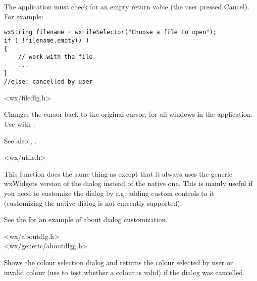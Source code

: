 The application must check for an empty return value (the user pressed
Cancel). For example:

\begin{verbatim}
wxString filename = wxFileSelector("Choose a file to open");
if ( !filename.empty() )
{
    // work with the file
    ...
}
//else: cancelled by user
\end{verbatim}


<wx/filedlg.h>


\label{wxendbusycursor}


Changes the cursor back to the original cursor, for all windows in the application.
Use with .

See also , .


<wx/utils.h>


\label{wxgenericaboutbox}


This function does the same thing as  except
that it always uses the generic wxWidgets version of the dialog instead of the
native one. This is mainly useful if you need to customize the dialog by e.g.
adding custom controls to it (customizing the native dialog is not currently
supported).

See the  for an example of about dialog
customization.




<wx/aboutdlg.h>\\
<wx/generic/aboutdlgg.h>


\label{wxgetcolourfromuser}


Shows the colour selection dialog and returns the colour selected by user or
invalid colour (use  to test whether a colour
is valid) if the dialog was cancelled.

